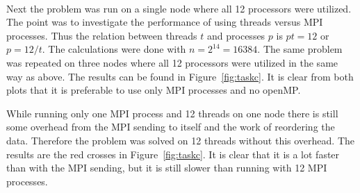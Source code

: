 %
\\
Next the problem was run on a single node where all 12 processors were utilized. The point was to investigate the performance of using threads versus MPI processes. Thus the relation between threads $t$ and processes $p$ is $p t = 12$ or $p = 12/t$. The calculations were done with $n = 2^{14} = 16384$. 
The same problem was repeated on three nodes where all 12 processors were utilized in the same way as above. The results can be found in Figure~\ref{fig:taskc}. It is clear from both plots that it is preferable to use only MPI processes and no openMP. 

While running only one MPI process and 12 threads on one node there is still some overhead from the MPI sending to itself and the work of reordering the data. Therefore the problem was solved on 12 threads without this overhead. The results are the red crosses in Figure~\ref{fig:taskc}. It is clear that it is a lot faster than with the MPI sending, but it is still slower than running with 12 MPI processes. 
\\
